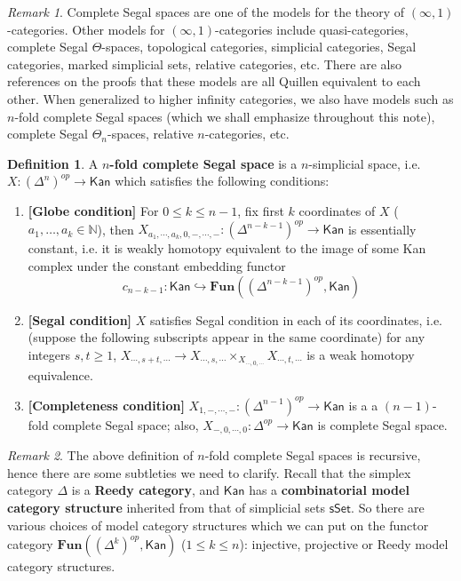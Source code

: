 \documentclass{article}
\theoremstyle{definition}
\newtheorem{mydef}{Definition}[section]
\theoremstyle{remark}
\newtheorem*{remark}{Remark}
\begin{document}
\begin{remark}
Complete Segal spaces are one of the models for the theory of $(\infty,1)$-categories. Other models for $(\infty,1)$-categories include quasi-categories, complete Segal $\Theta$-spaces, topological categories, simplicial categories, Segal categories, marked simplicial sets, relative categories, etc. There are also references on the proofs that these models are all Quillen equivalent to each other. When generalized to higher infinity categories, we also have models such as $n$-fold complete Segal spaces (which we shall emphasize throughout this note), complete Segal $\Theta_n$-spaces, relative $n$-categories, etc.
\end{remark}

\begin{mydef}
A \textbf{$n$-fold complete Segal space} is a $n$-simplicial space, i.e. $X: (\Delta^n)^{op} \to \mathsf{Kan}$ which satisfies the following conditions:

\begin{enumerate}
    \item  \textbf{[Globe condition]} For $0 \leq k \leq n-1$, fix first $k$ coordinates of $X$  ($a_1,\dots,a_k \in \mathbb{N}$), then $X_{a_1,\cdots,a_k,0,-,\cdots,-}: (\Delta^{n-k-1})^{op} \to \mathsf{Kan}$ is essentially constant, i.e. it is weakly homotopy equivalent to the image of some Kan complex under the constant embedding functor $$ c_{n-k-1}: \mathsf{Kan} \hookrightarrow \mathbf{Fun}((\Delta^{n-k-1})^{op},\mathsf{Kan})$$
    \item  \textbf{[Segal condition]} $X$ satisfies Segal condition in each of its coordinates, i.e. (suppose the following subscripts appear in the same coordinate) for any integers $s,t \geq 1$, $X_{\cdots,s+t,\cdots} \to X_{\cdots,s,\cdots} \times_{X_{\cdots,0,\cdots}} X_{\cdots,t,\cdots}$ is a weak homotopy equivalence.
    \item  \textbf{[Completeness condition]} $X_{1,-,\cdots,-}: (\Delta^{n-1})^{op} \to \mathsf{Kan}$ is a a $(n-1)$-fold complete Segal space; also, $X_{-,0,\cdots,0}: \Delta^{op} \to \mathsf{Kan}$ is complete Segal space.
\end{enumerate}

\end{mydef}

\begin{remark}
The above definition of $n$-fold complete Segal spaces is recursive, hence there are some subtleties we need to clarify. Recall that the simplex category $\Delta$ is a \textbf{Reedy category}, and $\mathsf{Kan}$ has a \textbf{combinatorial model category structure} inherited from that of simplicial sets $\mathsf{sSet}$. So there are various choices of model category structures which we can put on the  functor category $\mathbf{Fun}((\Delta^k)^{op},\mathsf{Kan})$ ($1 \leq k \leq n$): injective, projective or Reedy model category structures.
\end{remark}
\end{document}
